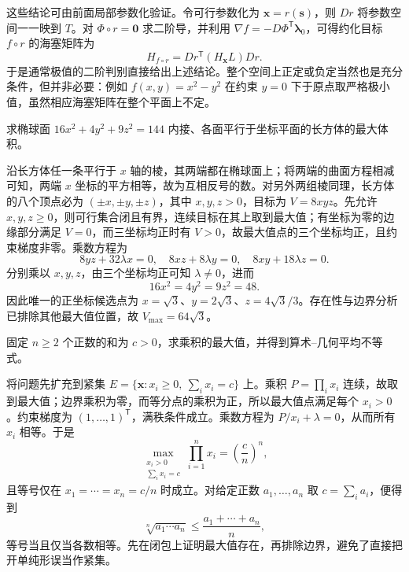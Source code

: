 \documentclass[UTF8,12pt,a4paper,fontset=fandol]{ctexbook}
\begin{document}
这些结论可由前面局部参数化验证。令可行参数化为 $\boldsymbol x=r(\boldsymbol s)$，则 $Dr$ 将参数空间一一映到 $T$。对 $\Phi\circ r=\boldsymbol0$ 求二阶导，并利用 $\nabla f=-D\Phi^{\mathsf T}\boldsymbol\lambda_0$，可得约化目标 $f\circ r$ 的海塞矩阵为
\[
    H_{f\circ r}=Dr^{\mathsf T}(H_{\boldsymbol x}L)Dr.
\]
于是通常极值的二阶判别直接给出上述结论。整个空间上正定或负定当然也是充分条件，但并非必要：例如 $f(x,y)=x^2-y^2$ 在约束 $y=0$ 下于原点取严格极小值，虽然相应海塞矩阵在整个平面上不定。

\begin{example}
\label{ex:ellipsoid-inscribed-box-ch14}
求椭球面 $16x^2+4y^2+9z^2=144$ 内接、各面平行于坐标平面的长方体的最大体积。
\end{example}
\begin{solve}
沿长方体任一条平行于 $x$ 轴的棱，其两端都在椭球面上；将两端的曲面方程相减可知，两端 $x$ 坐标的平方相等，故为互相反号的数。对另外两组棱同理，长方体的八个顶点必为 $(\pm x,\pm y,\pm z)$，其中 $x,y,z>0$，目标为 $V=8xyz$。先允许 $x,y,z\geq0$，则可行集合闭且有界，连续目标在其上取到最大值；有坐标为零的边缘部分满足 $V=0$，而三坐标均正时有 $V>0$，故最大值点的三个坐标均正，且约束梯度非零。乘数方程为
\[
    8yz+32\lambda x=0,\quad
    8xz+8\lambda y=0,\quad
    8xy+18\lambda z=0.
\]
分别乘以 $x,y,z$，由三个坐标均正可知 $\lambda\ne0$，进而
\[
    16x^2=4y^2=9z^2=48.
\]
因此唯一的正坐标候选点为 $x=\sqrt3$、$y=2\sqrt3$、$z=4\sqrt3/3$。存在性与边界分析已排除其他最大值位置，故 $V_{\max}=64\sqrt3$。
\end{solve}

\begin{example}
\label{ex:product-maximum-and-amgm-ch14}
固定 $n\geq2$ 个正数的和为 $c>0$，求乘积的最大值，并得到算术--几何平均不等式。
\end{example}
\begin{solve}
将问题先扩充到紧集 $E=\{\boldsymbol x:x_i\geq0,\ \sum_i x_i=c\}$ 上。乘积 $P=\prod_i x_i$ 连续，故取到最大值；边界乘积为零，而等分点的乘积为正，所以最大值点满足每个 $x_i>0$。约束梯度为 $(1,\ldots,1)^{\mathsf T}$，满秩条件成立。乘数方程为 $P/x_i+\lambda=0$，从而所有 $x_i$ 相等。于是
\[
    \max_{\substack{x_i>0\\\sum_i x_i=c}}\prod_{i=1}^n x_i
       =\left(\frac cn\right)^n,
\]
且等号仅在 $x_1=\cdots=x_n=c/n$ 时成立。对给定正数 $a_1,\ldots,a_n$ 取 $c=\sum_i a_i$，便得到
\[
    \sqrt[n]{a_1\cdots a_n}\leq\frac{a_1+\cdots+a_n}{n},
\]
等号当且仅当各数相等。先在闭包上证明最大值存在，再排除边界，避免了直接把开单纯形误当作紧集。
\end{solve}
\end{document}
